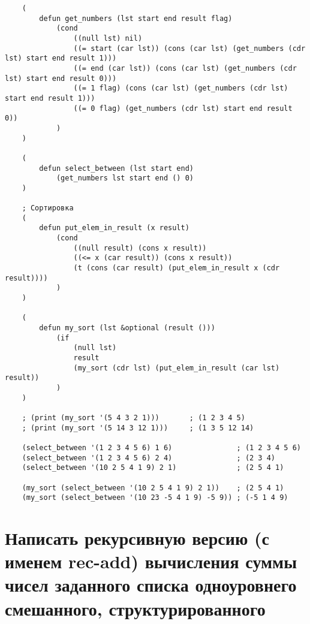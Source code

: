 \begin{lstlisting}
    (
        defun get_numbers (lst start end result flag)
            (cond
                ((null lst) nil)
                ((= start (car lst)) (cons (car lst) (get_numbers (cdr lst) start end result 1))) 
                ((= end (car lst)) (cons (car lst) (get_numbers (cdr lst) start end result 0))) 
                ((= 1 flag) (cons (car lst) (get_numbers (cdr lst) start end result 1)))
                ((= 0 flag) (get_numbers (cdr lst) start end result 0))
            )
    )
    
    (
        defun select_between (lst start end)
            (get_numbers lst start end () 0)
    )
    
    ; Сортировка
    (
        defun put_elem_in_result (x result)
            (cond
                ((null result) (cons x result))
                ((<= x (car result)) (cons x result))
                (t (cons (car result) (put_elem_in_result x (cdr result))))
            )
    )
    
    (
        defun my_sort (lst &optional (result ()))
            (if
                (null lst)
                result
                (my_sort (cdr lst) (put_elem_in_result (car lst) result))
            )
    )
    
    ; (print (my_sort '(5 4 3 2 1)))       ; (1 2 3 4 5)
    ; (print (my_sort '(5 14 3 12 1)))     ; (1 3 5 12 14) 
    
    (select_between '(1 2 3 4 5 6) 1 6)               ; (1 2 3 4 5 6)
    (select_between '(1 2 3 4 5 6) 2 4)               ; (2 3 4) 
    (select_between '(10 2 5 4 1 9) 2 1)              ; (2 5 4 1)  
    
    (my_sort (select_between '(10 2 5 4 1 9) 2 1))    ; (2 5 4 1)  
    (my_sort (select_between '(10 23 -5 4 1 9) -5 9)) ; (-5 1 4 9)   
\end{lstlisting}

\section{Написать рекурсивную версию (с именем rec-add) вычисления суммы чисел заданного списка одноуровнего смешанного, структурированного}

